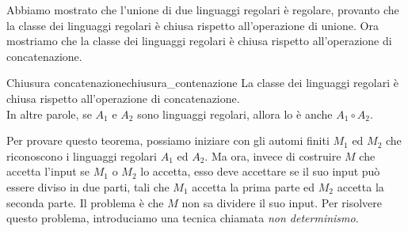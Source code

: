 \documentclass[12pt]{report}
\newcounter{theorem}
\newcommand{\nmu}{}
\begin{document}
	Abbiamo mostrato che l'unione di due linguaggi regolari è regolare, provanto che la classe dei linguaggi regolari è chiusa rispetto all'operazione di unione. Ora mostriamo che la classe dei linguaggi regolari è chiusa rispetto all'operazione di concatenazione.
	\begin{theorem}{\nmu Chiusura concatenazione}{chiusura_contenazione}
		La classe dei linguaggi regolari è chiusa rispetto all'operazione di concatenazione. \\
		In altre parole, se $A_1$ e $A_2$ sono linguaggi regolari, allora lo è anche $A_1 \circ A_2$.
	\end{theorem}
	Per provare questo teorema, possiamo iniziare con gli automi finiti $M_1$ ed $M_2$ che riconoscono i linguaggi regolari $A_1$ ed $A_2$. Ma ora, invece di costruire $M$ che accetta l'input se $M_1$ o $M_2$ lo accetta, esso deve accettare se il suo input può essere diviso in due parti, tali che $M_1$ accetta la prima parte ed $M_2$ accetta la seconda parte. Il problema è che $M$ non sa dividere il suo input. Per risolvere questo problema, introduciamo una tecnica chiamata \textit{non determinismo}.
\end{document}
